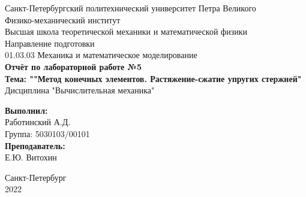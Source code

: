 \documentclass[12pt,a4paper]{article}
\begin{document}
	\begin{titlepage}
		
		\begin{center}	
			
			\large Санкт-Петербургский политехнический университет Петра Великого \\
			\large Физико-механический институт \\
			\large Высшая школа теоретической механики и математической физики \\[2cm] %
			
			\large Направление подготовки \\
			\large 01.03.03 Механика и математическое моделирование \\[4cm]
			
			
			\LARGE \textbf {Отчёт по лабораторной работе №5} \\[0.5cm] 
			\LARGE \textbf {Тема: ""Метод конечных элементов. Растяжение-сжатие упругих
				стержней"} \\[0.5cm]
			\large Дисциплина "Вычислительная механика" \\[4cm]
			
			
			
		\end{center}
		
		
		\begin{flushright} %
			\begin{minipage}{0.25\textwidth} %
				\begin{flushleft}
					
					\large\textbf{Выполнил:}\\
					\large Работинский А.Д. \\
					\large {Группа:} 5030103/00101 \\
					
					\large \textbf{Преподаватель:}\\
					\large Е.Ю. Витохин
					
				\end{flushleft}
			\end{minipage}
		\end{flushright}
		
		
		\begin{center}
			\large Санкт-Петербург \\
			\large 2022 
		\end{center} 
		
	\end{titlepage} 
	
\end{document}
